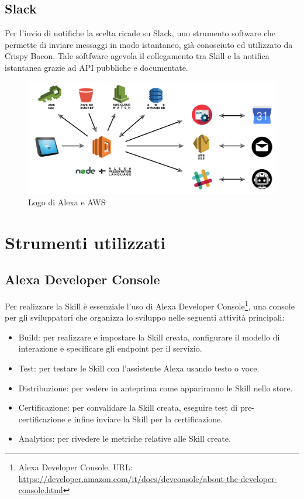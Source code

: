 \subsection{Slack}
Per l'invio di notifiche la scelta ricade su Slack, uno strumento software che permette di inviare messaggi in modo istantaneo, già conosciuto ed utilizzato da Crispy Bacon. Tale softfware agevola il collegamento tra Skill e la notifica istantanea grazie ad API pubbliche e documentate.  

\begin{figure}[H] 
    \centering 
    \includegraphics[width=1\columnwidth]{immagini/architettura.png}
    \caption{\label{fig:alexa_aws}Logo di Alexa e AWS}
\end{figure}

\section{Strumenti utilizzati}
\subsection{Alexa Developer Console}
Per realizzare la Skill è essenziale l'uso di Alexa Developer Console\footnote{Alexa Developer Console. URL: \href{https://developer.amazon.com/it/docs/devconsole/about-the-developer-console.html}{https://developer.amazon.com/it/docs/devconsole/about-the-developer-console.html}}, una console per gli sviluppatori che organizza lo sviluppo nelle seguenti attività principali:
\begin{itemize}
    \item Build: per realizzare e impostare la Skill creata, configurare il modello di interazione e specificare gli endpoint per il servizio.
    \item Test: per testare le Skill con l'assistente Alexa usando testo o voce.
    \item Distribuzione: per vedere in anteprima come appariranno le Skill nello store.
    \item Certificazione: per convalidare la Skill creata, eseguire test di pre-certificazione e infine inviare la Skill per la certificazione.
    \item Analytics: per rivedere le metriche relative alle Skill create.
\end{itemize}

